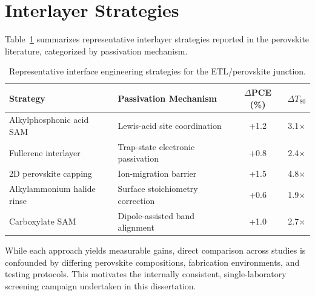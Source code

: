\section{Interlayer Strategies}

Table~\ref{tab:literature} summarizes representative interlayer strategies
reported in the perovskite literature, categorized by passivation
mechanism.

\begin{table}[htbp]
\centering
\caption{Representative interface engineering strategies for the
ETL/perovskite junction.}
\label{tab:literature}
\begin{tabularx}{\linewidth}{@{}l X c c@{}}
\toprule
\textbf{Strategy} & \textbf{Passivation Mechanism} & \textbf{$\Delta$PCE (\%)} & \textbf{$\Delta T_{80}$} \\
\midrule
Alkylphosphonic acid SAM & Lewis-acid site coordination & +1.2 & 3.1$\times$ \\
Fullerene interlayer & Trap-state electronic passivation & +0.8 & 2.4$\times$ \\
2D perovskite capping & Ion-migration barrier & +1.5 & 4.8$\times$ \\
Alkylammonium halide rinse & Surface stoichiometry correction & +0.6 & 1.9$\times$ \\
Carboxylate SAM & Dipole-assisted band alignment & +1.0 & 2.7$\times$ \\
\bottomrule
\end{tabularx}
\end{table}

While each approach yields measurable gains, direct comparison across
studies is confounded by differing perovskite compositions, fabrication
environments, and testing protocols. This motivates the internally
consistent, single-laboratory screening campaign undertaken in this
dissertation.
